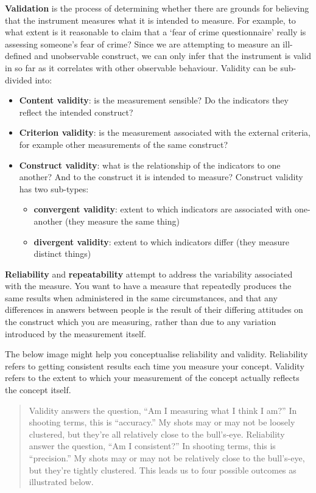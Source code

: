 \documentclass[]{book}
\providecommand{\tightlist}{%
  \setlength{\itemsep}{0pt}\setlength{\parskip}{0pt}}
\theoremstyle{definition}
\theoremstyle{definition}
\theoremstyle{definition}
\theoremstyle{remark}
\begin{document}
\textbf{Validation} is the process of determining whether there are
grounds for believing that the instrument measures what it is intended
to measure. For example, to what extent is it reasonable to claim that a
`fear of crime questionnaire' really is assessing someone's fear of
crime? Since we are attempting to measure an ill-defined and
unobservable construct, we can only infer that the instrument is valid
in so far as it correlates with other observable behaviour. Validity can
be sub-divided into:

\begin{itemize}
\tightlist
\item
  \textbf{Content validity}: is the measurement sensible? Do the
  indicators they reflect the intended construct?
\item
  \textbf{Criterion validity}: is the measurement associated with the
  external criteria, for example other measurements of the same
  construct?
\item
  \textbf{Construct validity}: what is the relationship of the
  indicators to one another? And to the construct it is intended to
  measure? Construct validity has two sub-types:

  \begin{itemize}
  \tightlist
  \item
    \textbf{convergent validity}: extent to which indicators are
    associated with one-another (they measure the same thing)
  \item
    \textbf{divergent validity}: extent to which indicators differ (they
    measure distinct things)
  \end{itemize}
\end{itemize}

\textbf{Reliability} and \textbf{repeatability} attempt to address the
variability associated with the measure. You want to have a measure that
repeatedly produces the same results when administered in the same
circumstances, and that any differences in answers between people is the
result of their differing attitudes on the construct which you are
measuring, rather than due to any variation introduced by the
measurement itself.

The below image might help you conceptualise reliability and validity.
Reliability refers to getting consistent results each time you measure
your concept. Validity refers to the extent to which your measurement of
the concept actually reflects the concept itself.

\begin{quote}
Validity answers the question, ``Am I measuring what I think I am?'' In
shooting terms, this is ``accuracy.'' My shots may or may not be loosely
clustered, but they're all relatively close to the bull's-eye.
Reliability answer the question, ``Am I consistent?'' In shooting terms,
this is ``precision.'' My shots may or may not be relatively close to
the bull's-eye, but they're tightly clustered. This leads us to four
possible outcomes as illustrated below.
\end{quote}
\end{document}
